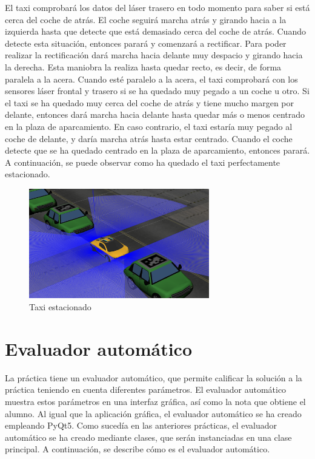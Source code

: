 El taxi comprobará los datos del láser trasero en todo momento para saber si está cerca del coche de atrás. El coche seguirá marcha atrás y girando hacia a la izquierda hasta que detecte que está demasiado cerca del coche de atrás. Cuando detecte esta situación, entonces parará y comenzará a rectificar. Para poder realizar la rectificación dará marcha hacia delante muy despacio y girando hacia la derecha. Esta maniobra la realiza hasta quedar recto, es decir, de forma paralela a la acera. Cuando esté paralelo a la acera, el taxi comprobará con los sensores láser frontal y trasero si se ha quedado muy pegado a un coche u otro. Si el taxi se ha quedado muy cerca del coche de atrás y tiene mucho margen por delante, entonces dará marcha hacia delante hasta quedar más o menos centrado en la plaza de aparcamiento. En caso contrario, el taxi estaría muy pegado al coche de delante, y daría marcha atrás hasta estar centrado. Cuando el coche detecte que se ha quedado centrado en la plaza de aparcamiento, entonces parará. A continuación, se puede observar como ha quedado el taxi perfectamente estacionado.

\begin{figure}[H]
  \begin{center}
    \includegraphics[width=0.7\textwidth]{figures/Autopark/Posicion5.png}
		\caption{Taxi estacionado}
		\label{fig.Posicion5}
		\end{center}
\end{figure}


\section{Evaluador automático}
La práctica tiene un evaluador automático, que permite calificar la solución a la práctica teniendo en cuenta diferentes parámetros. El evaluador automático muestra estos parámetros en una interfaz gráfica, así como la nota que obtiene el alumno. Al igual que la aplicación gráfica, el evaluador automático se ha creado empleando PyQt5. Como sucedía en las anteriores prácticas, el evaluador automático se ha creado mediante clases, que serán instanciadas en una clase principal. A continuación, se describe cómo es el evaluador automático.\\

